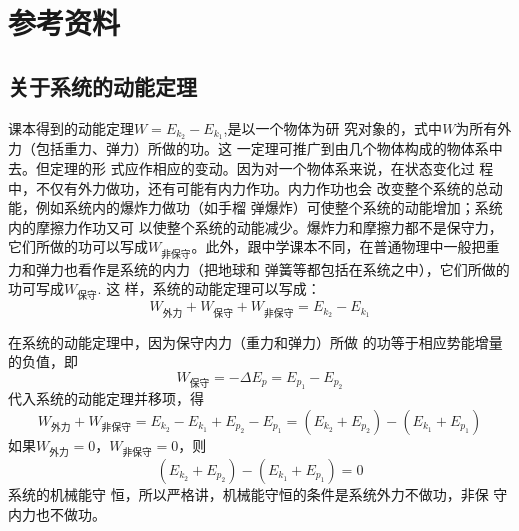 \section{参考资料}
\subsection{关于系统的动能定理}
课本得到的动能定理$W=E_{k_2}-E_{k_1}$,是以一个物体为研
究对象的，式中$W$为所有外力（包括重力、弹力）所做的功。这
一定理可推广到由几个物体构成的物体系中去。但定理的形
式应作相应的变动。因为对一个物体系来说，在状态变化过
程中，不仅有外力做功，还有可能有内力作功。内力作功也会
改变整个系统的总动能，例如系统内的爆炸力做功（如手榴
弹爆炸）可使整个系统的动能增加；系统内的摩擦力作功又可
以使整个系统的动能减少。爆炸力和摩擦力都不是保守力，
它们所做的功可以写成$W_{\text{非保守}}$。此外，跟中学课本不同，在普通物理中一般把重力和弹力也看作是系统的内力（把地球和
弹簧等都包括在系统之中），它们所做的功可写成$W_{\text{保守}}$. 这
样，系统的动能定理可以写成：
\[W_{\text{外力}}+W_{\text{保守}}+W_{\text{非保守}}=E_{k_2}-E_{k_1}\]

在系统的动能定理中，因为保守内力（重力和弹力）所做
的功等于相应势能增量的负值，即
\[W_{\text{保守}}=-\Delta E_p=E_{p_1}-E_{p_2}\]
代入系统的动能定理并移项，得
\[W_{\text{外力}}+W_{\text{非保守}}=E_{k_2}-E_{k_1}+E_{p_2}-E_{p_1}=(E_{k_2}+E_{p_2})-(E_{k_1}+E_{p_1})\]
如果$W_{\text{外力}}=0$，$W_{\text{非保守}}=0$，则
\[(E_{k_2}+E_{p_2})-(E_{k_1}+E_{p_1})=0\]
系统的机械能守
恒，所以严格讲，机械能守恒的条件是系统外力不做功，非保
守内力也不做功。





























